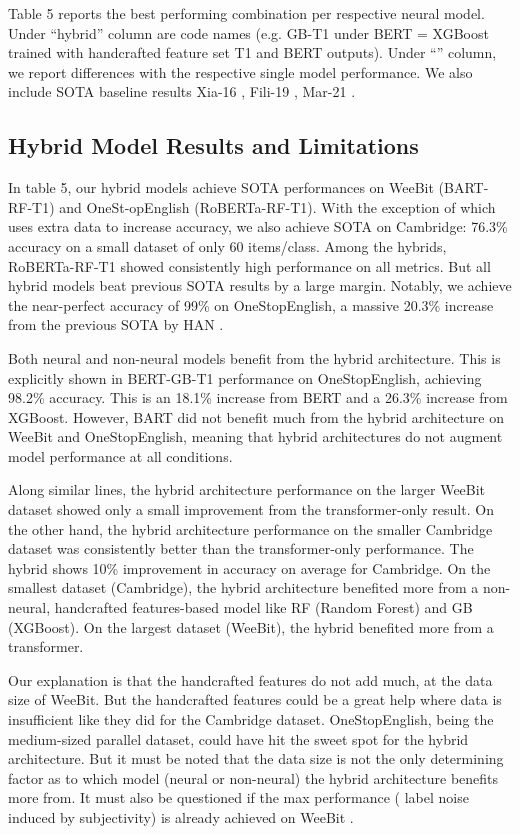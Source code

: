 \documentclass[11pt]{article}
\begin{document}
Table 5 reports the best performing combination per respective neural model. Under ``hybrid'' column are code names (e.g. GB-T1 under BERT = XGBoost trained with handcrafted feature set T1 and BERT outputs). Under ``'' column, we report differences with the respective single model performance. We also include SOTA baseline results Xia-16  \citet{Xia:16}, Fili-19  \citet{Fili:19}, Mar-21  \citet{Martinc:21}.

\subsection{Hybrid Model Results and Limitations}
In table 5, our hybrid models achieve SOTA performances on WeeBit (BART-RF-T1) and OneSt-opEnglish (RoBERTa-RF-T1). With the exception of \citet{Xia:16} which uses extra data to increase accuracy, we also achieve SOTA on Cambridge: 76.3\% accuracy on a small dataset of only 60 items/class. Among the hybrids, RoBERTa-RF-T1 showed consistently high performance on all metrics. But all hybrid models beat previous SOTA results by a large margin. Notably, we achieve the near-perfect accuracy of 99\% on OneStopEnglish, a massive 20.3\% increase from the previous SOTA \citep{Martinc:21} by HAN \citep{10.1007/978-3-030-45439-5_3}.

Both neural and non-neural models benefit from the hybrid architecture. This is explicitly shown in BERT-GB-T1 performance on OneStopEnglish, achieving 98.2\% accuracy. This is an 18.1\% increase from BERT and a 26.3\% increase from XGBoost. However, BART did not benefit much from the hybrid architecture on WeeBit and OneStopEnglish, meaning that hybrid architectures do not augment model performance at all conditions. 

Along similar lines, the hybrid architecture performance on the larger WeeBit dataset showed only a small improvement from the transformer-only result. On the other hand, the hybrid architecture performance on the smaller Cambridge dataset was consistently better than the transformer-only performance. The hybrid shows 10\% improvement in accuracy on average for Cambridge. On the smallest dataset (Cambridge), the hybrid architecture benefited more from a non-neural, handcrafted features-based model like RF (Random Forest) and GB (XGBoost). On the largest dataset (WeeBit), the hybrid benefited more from a transformer. 

Our explanation is that the handcrafted features do not add much, at the data size of WeeBit. But the handcrafted features could be a great help where data is insufficient like they did for the Cambridge dataset. OneStopEnglish, being the medium-sized parallel dataset, could have hit the sweet spot for the hybrid architecture. But it must be noted that the data size is not the only determining factor as to which model (neural or non-neural) the hybrid architecture benefits more from. It must also be questioned if the max performance ( label noise induced by subjectivity) \citep{frenay2014comprehensive} is already achieved on WeeBit \citep{deutsch-etal-2020-linguistic}. 
\end{document}
